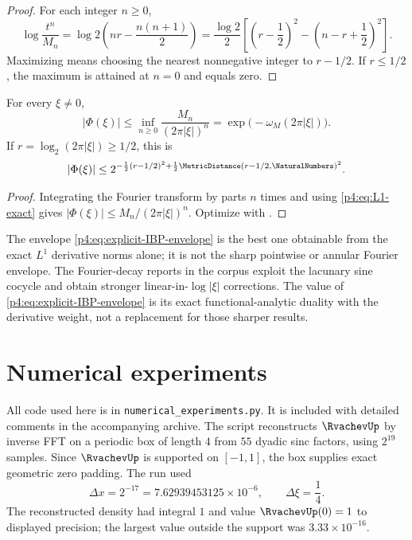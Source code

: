 \documentclass[11pt,oneside]{article}
\theoremstyle{definition}
\theoremstyle{remark}
\begin{document}
\begin{proof}
For each integer $n\geq0$,
\[
 \log\frac{t^n}{M_n}
 =\log2\left(nr-\frac{n(n+1)}2\right)
 =\frac{\log2}{2}\left[
 \left(r-\frac12\right)^2-
 \left(n-r+\frac12\right)^2\right].
\]
Maximizing means choosing the nearest nonnegative integer to $r-1/2$.  If $r\leq1/2$, the
maximum is attained at $n=0$ and equals zero.
\end{proof}

\begin{corollary}
\label{p4:cor:IBP-envelope}
For every $\xi\neq0$,
\begin{equation}
 \boxed{
 |\Phi(\xi)|
 \leq\inf_{n\geq0}\frac{M_n}{(2\pi|\xi|)^n}
 =\exp\bigl(-\omega_M(2\pi|\xi|)\bigr).}
 \label{p4:eq:IBP-envelope}
\end{equation}
If $r=\log_2(2\pi|\xi|)\geq1/2$, this is
\begin{equation}
 |\Phi(\xi)|\leq
 2^{-\frac12(r-1/2)^2+\frac12\MetricDistance(r-1/2,\NaturalNumbers)^2}.
 \label{p4:eq:explicit-IBP-envelope}
\end{equation}
\end{corollary}

\begin{proof}
Integrating the Fourier transform by parts $n$ times and using
\eqref{p4:eq:L1-exact} gives
$|\Phi(\xi)|\leq M_n/(2\pi|\xi|)^n$.  Optimize with
.
\end{proof}

\begin{warning}
The envelope \eqref{p4:eq:explicit-IBP-envelope} is the best one obtainable from the exact
$L^1$ derivative norms alone; it is not the sharp pointwise or annular Fourier envelope.
The Fourier-decay reports in the corpus exploit the lacunary sine cocycle and obtain stronger
linear-in-$\log|\xi|$ corrections.  The value of \eqref{p4:eq:explicit-IBP-envelope} is its exact
functional-analytic duality with the derivative weight, not a replacement for those sharper
results.
\end{warning}

\section{Numerical experiments}
\label{p4:sec:numerics}

All code used here is in \texttt{numerical\_experiments.py}.  It is included with detailed
comments in the accompanying archive.  The script reconstructs $\RvachevUp$ by inverse FFT on a
periodic box of length $4$ from $55$ dyadic sinc factors, using $2^{19}$ samples.  Since
$\RvachevUp$ is supported on $[-1,1]$, the box supplies exact geometric zero padding.  The run used
\[
 \Delta x=2^{-17}=7.62939453125\times10^{-6},
 \qquad \Delta\xi=\frac14.
\]
The reconstructed density had integral $1$ and value $\RvachevUp(0)=1$ to displayed precision;
the largest value outside the support was $3.33\times10^{-16}$.
\end{document}
